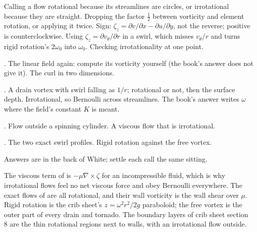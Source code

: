 \begin{trap}
Calling a flow rotational because its streamlines are circles, or irrotational because they are straight. Dropping the factor $\frac12$ between vorticity and element rotation, or applying it twice. Sign: $\zeta_z = \partial v/\partial x - \partial u/\partial y$, not the reverse; positive is counterclockwise. Using $\zeta_z = \partial v_\theta/\partial r$ in a swirl, which misses $v_\theta/r$ and turns rigid rotation's $2\omega_0$ into $\omega_0$. Checking irrotationality at one point.
\end{trap}

\begin{ladder}
\item {}. The linear field again: compute its vorticity yourself (the book's answer does not give it). The curl in two dimensions.
\item {}. A drain vortex with swirl falling as $1/r$; rotational or not, then the surface depth. Irrotational, so Bernoulli across streamlines. The book's answer writes $\omega$ where the field's constant $K$ is meant.
\item {}. Flow outside a spinning cylinder. A viscous flow that is irrotational.
\item {}. The two exact swirl profiles. Rigid rotation against the free vortex.
\end{ladder}
Answers are in the back of White; settle each call the same sitting.


\begin{hides}
The viscous term of  is $-\mu\nabla\times\zeta$ for an incompressible fluid, which is why irrotational flows feel no net viscous force and obey Bernoulli everywhere. The exact flows of  are all rotational, and their wall vorticity is the wall shear over $\mu$. Rigid rotation is the crib sheet's $z = \omega^2r^2/2g$ paraboloid; the free vortex is the outer part of every drain and tornado. The boundary layers of crib sheet section 8 are the thin rotational regions next to walls, with an irrotational flow outside.
\end{hides}
